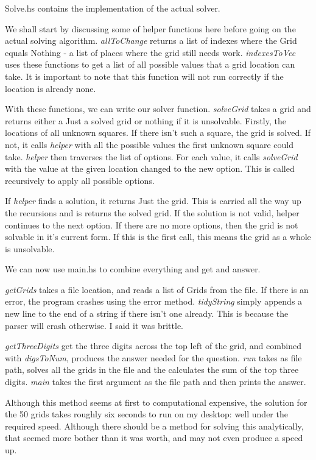 Solve.hs contains the implementation of the actual solver.



We shall start by discussing some of helper functions here before going on the actual solving algorithm. \textit{allToChange} returns a list of indexes where the Grid equals Nothing - a list of places where the grid still needs work. \textit{indexesToVec} uses these functions to get a list of all possible values that a grid location can take. It is important to note that this function will not run correctly if the location is already none.

With these functions, we can write our solver function. \textit{solveGrid} takes a grid and returns either a Just a solved grid or nothing if it is unsolvable. Firstly, the locations of all unknown squares. If there isn't such a square, the grid is solved. If not, it calls \textit{helper} with all the possible values the first unknown square could take. \textit{helper} then traverses the list of options. For each value, it calls \textit{solveGrid} with the value at the given location changed to the new option. This is called recursively to apply all possible options.

If \textit{helper} finds a solution, it returns Just the grid. This is carried all the way up the recursions and is returns the solved grid. If the solution is not valid, helper continues to the next option. If there are no more options, then the grid is not solvable in it's current form. If this is the first call, this means the grid as a whole is unsolvable.

We can now use main.hs to combine everything and get and answer.



\textit{getGrids} takes a file location, and reads a list of Grids from the file. If there is an error, the program crashes using the error method. \textit{tidyString} simply appends a new line to the end of a string if there isn't one already. This is because the parser will crash otherwise. I said it was brittle.

\textit{getThreeDigits} get the three digits across the top left of the grid, and combined with \textit{digsToNum}, produces the answer needed for the question. \textit{run} takes as file path, solves all the grids in the file and the calculates the sum of the top three digits. \textit{main} takes the first argument as the file path and then prints the answer.

Although this method seems at first to computational expensive, the solution for the 50 grids takes roughly six seconds to run on my desktop: well under the required speed. Although there should be a method for solving this analytically, that seemed more bother than it was worth, and may not even produce a speed up.
